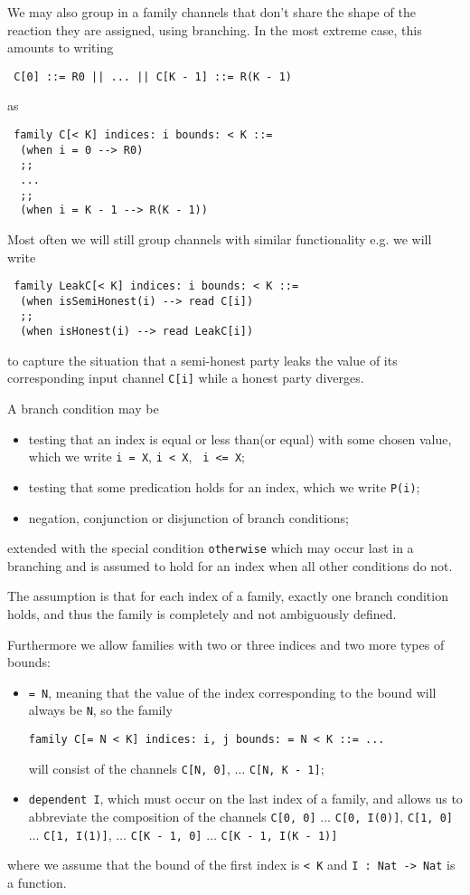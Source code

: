 \documentclass{article}
\begin{document}
We may also group in a family channels that don't share the shape 
of the reaction they are assigned, using branching. In the most extreme case,
this amounts to writing
\begin{lstlisting}
 C[0] ::= R0 || ... || C[K - 1] ::= R(K - 1)
\end{lstlisting}
as
\begin{lstlisting}
 family C[< K] indices: i bounds: < K ::=
  (when i = 0 --> R0) 
  ;;
  ...
  ;;
  (when i = K - 1 --> R(K - 1))
\end{lstlisting} 
Most often we will still group channels with similar functionality e.g. we will
write
\begin{lstlisting}
 family LeakC[< K] indices: i bounds: < K ::=
  (when isSemiHonest(i) --> read C[i]) 
  ;;
  (when isHonest(i) --> read LeakC[i])
\end{lstlisting} 
\noindent to capture the situation that a semi-honest party leaks the value of its corresponding input channel \texttt{C[i]} while a honest party diverges.

A branch condition may be
\begin{itemize}
\item testing that an index is equal or less than(or equal) with some chosen value, which we write \texttt{i = X}, \texttt{i < X}, \texttt{ i <= X};
\item testing that some predication holds for an index, which we write 
\texttt{P(i)};
\item negation, conjunction or disjunction of branch conditions;
\end{itemize}
\noindent extended with the special condition \texttt{otherwise} which may occur last in a branching and is assumed to hold for an index when all other conditions do not.

The assumption is that for each index of a family, exactly one branch condition holds, and thus the family is completely and not ambiguously defined.

Furthermore we allow families with two or three indices and two more types of bounds: 
\begin{itemize}
\item \texttt{= N}, meaning that the value of the index corresponding to the bound will always be \texttt{N}, so the family 
\begin{lstlisting}
family C[= N < K] indices: i, j bounds: = N < K ::= ...
\end{lstlisting}
will consist of the channels \texttt{C[N, 0]}, $\ldots$ \texttt{C[N, K - 1]};
\item \texttt{dependent I}, which must occur on the last index of a family, and allows us to abbreviate the composition of the channels 
\texttt{C[0, 0]} $\ldots$ \texttt{C[0, I(0)]},
\texttt{C[1, 0]} $\ldots$ \texttt{C[1, I(1)]}, 
$\ldots$
\texttt{C[K - 1, 0]} $\ldots$ \texttt{C[K - 1, I(K - 1)]}
\end{itemize}
\noindent where we assume that the bound of the first index is \texttt{< K} and
\texttt{I : Nat -> Nat} is a function.
\end{document}
